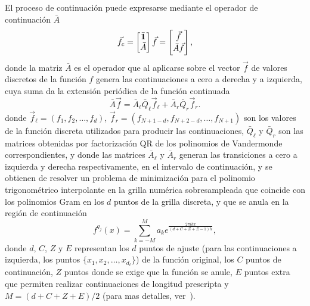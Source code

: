 El proceso de continuación puede expresarse mediante el operador de continuación $\bar{A}$
\begin{equation}
\vec{f}_c= 
\begin{bmatrix}
    \bar{\mathbf{1}} \\
    \bar{A}  \\
\end{bmatrix}
\vec{f}=
\begin{bmatrix}
    \vec{f}\\
    \bar{A} \vec{f}  \\
\end{bmatrix}
,
\label{eq:FCopA}
\end{equation}
donde la matriz $\bar{A}$ es el operador que al aplicarse sobre 
el vector $\vec{f}$ de valores discretos de la función $f$ 
genera las continuaciones a cero a derecha y a izquierda, cuya suma 
da la extensión periódica de la función continuada
\begin{equation}
    \bar{A}  \vec{f} = \bar{A}_{\ell} \bar{Q}_{\ell}  \vec{f}_{\ell} 
+\bar{A}_{r} \bar{Q}_{r}  \vec{f}_{r}.
\label{eq:Acont}
\end{equation}
donde $\vec{f}_{\ell}=(f_1,f_2,\ldots,f_d)$, 
 $\vec{f}_{r}=(f_{N+1-d},f_{N+2-d},\ldots,f_{N+1})$ 
 son los valores de la función discreta utilizados para producir las continuaciones, $\bar{Q}_{\ell} $ y $\bar{Q}_{r}$ son las matrices obtenidas por factorización 
QR de los polinomios de Vandermonde correspondientes, y donde las matrices $\bar{A}_{\ell}$ 
y $\bar{A}_{r}$ generan las transiciones a cero a izquierda y derecha respectivamente, en el intervalo de continuación, 
y se obtienen de resolver un problema de minimización 
para el polinomio trigonométrico interpolante en la grilla numérica sobresampleada 
que coincide con los polinomios Gram en los $d$ puntos de la grilla discreta, y 
que se anula en la región de continuación
\begin{equation}
f^{q_j}(x)=\sum_{k=-M}^{M} a_k e^{\frac{2\pi i k x}{(d+C+Z+E-1)h}},
\label{eq:fccontint}
\end{equation}
donde $d$, $C$, $Z$ y $E$ representan los $d$ puntos de ajuste (para las continuaciones a izquierda, los puntos $\{x_{1},x_{2},\ldots, x_{d_{\ell}} \}$) de la función original, 
los $C$ puntos de continuación, $Z$ puntos donde se exige que la función se anule, $E$ 
puntos extra que permiten realizar continuaciones de longitud prescripta 
y $M=(d+C+Z+E)/2$ (para mas detalles, ver~\cite{Amlani2016,Bruno2010}).

